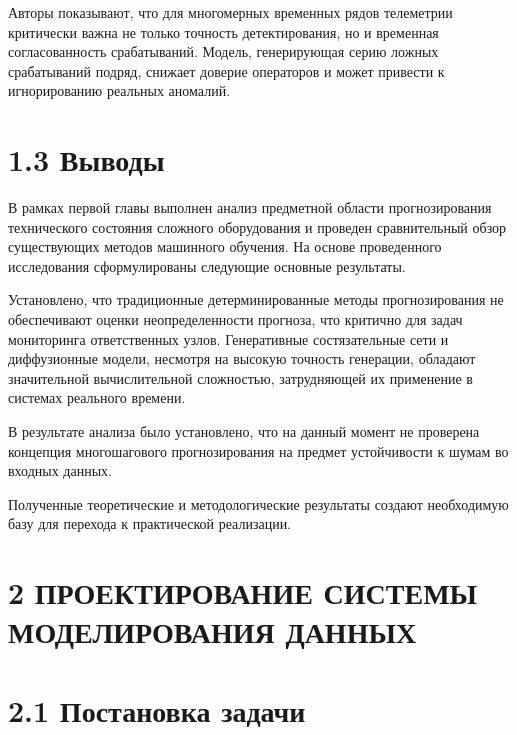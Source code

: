 \documentclass[14pt, a4paper, oneside]{extreport}
\begin{document}
Авторы показывают, что для многомерных временных рядов телеметрии критически важна не только точность детектирования, но и временная согласованность срабатываний. Модель, генерирующая серию ложных срабатываний подряд, снижает доверие операторов и может привести к игнорированию реальных аномалий.

\vspace{1em}
\section{1.3 Выводы}
\vspace{1em}

В рамках первой главы выполнен анализ предметной области прогнозирования технического состояния сложного оборудования и проведен сравнительный обзор существующих методов машинного обучения. На основе проведенного исследования сформулированы следующие основные результаты.

Установлено, что традиционные детерминированные методы прогнозирования не обеспечивают оценки неопределенности прогноза, что критично для задач мониторинга ответственных узлов. Генеративные состязательные сети и диффузионные модели, несмотря на высокую точность генерации, обладают значительной вычислительной сложностью, затрудняющей их применение в системах реального времени.

В результате анализа было установлено, что на данный момент не проверена  концепция многошагового прогнозирования на предмет устойчивости к шумам во входных данных.


Полученные теоретические и методологические результаты создают необходимую базу для перехода к практической реализации.

\clearpage



\section{2 ПРОЕКТИРОВАНИЕ СИСТЕМЫ МОДЕЛИРОВАНИЯ ДАННЫХ}
\section{2.1 Постановка задачи}
\vspace{1em} 
\end{document}
